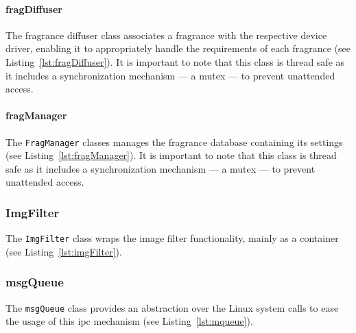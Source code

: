

\paragraph{\textbf{fragDiffuser}}
The fragrance diffuser class associates a fragrance with the respective device
driver, enabling it to appropriately handle the requirements of each
fragrance (see Listing~\ref{lst:fragDiffuser}).
It is important to note that this class is thread safe as it includes a
synchronization mechanism --- a mutex --- to prevent unattended access.



\paragraph{\textbf{fragManager}}
The \texttt{FragManager} classes manages the fragrance database containing its
settings (see Listing~\ref{lst:fragManager}).
It is important to note that this class is thread safe as it includes a
synchronization mechanism --- a mutex --- to prevent unattended access.



\subsubsection{ImgFilter}
\label{sec:imgfilter}
The \texttt{ImgFilter} class wraps the image filter functionality, mainly as a
container
(see Listing~\ref{lst:imgFilter}).



\subsubsection{msgQueue}
\label{sec:msgqueue}
The \texttt{msgQueue} class provides an abstraction over the Linux system calls
to ease the usage of this \gls{ipc} mechanism
(see Listing~\ref{lst:mqueue}).

